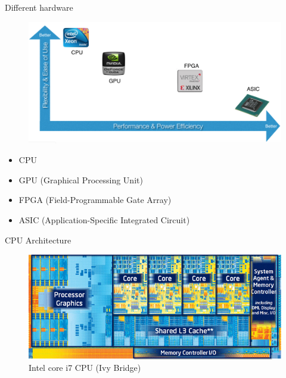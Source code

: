\documentclass{../TexTemplate/myslide}
\begin{document}
\begin{frame}{Different hardware}
\begin{figure}[H]
\centering
\includegraphics[width=0.8\linewidth]{fig/accelerator_comparison.png}
\end{figure}
\begin{itemize}
	\item CPU
	\item GPU (Graphical Processing Unit)
	\item FPGA (Field-Programmable Gate Array)
	\item ASIC (Application-Specific Integrated Circuit)
\end{itemize}
\end{frame}

\begin{frame}{CPU Architecture}
\begin{figure}
\centering
\includegraphics[width=0.9\linewidth]{fig/Intel-core-i7-cpu-die.jpg}
\caption*{\small Intel core i7 CPU (Ivy Bridge)}
\end{figure}
\end{frame}
\end{document}

